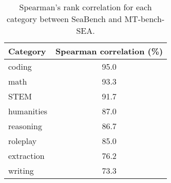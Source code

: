 \begin{table}[!ht]
    \centering
    \small
    \begin{tabular}{lc}
    \toprule
        \textbf{Category} & \textbf{Spearman correlation (\%)} \\ 
        \midrule
        coding & 95.0 \\ 
        math & 93.3 \\ 
        STEM & 91.7 \\ 
        humanities & 87.0 \\ 
        reasoning & 86.7 \\ 
        roleplay & 85.0 \\ 
        extraction & 76.2 \\ 
        writing & 73.3 \\ 
    \bottomrule
    \end{tabular}
    \caption{Spearman's rank correlation for each category between SeaBench and MT-bench-SEA.}
    \label{tab:corr_seaBench_type}
\end{table}